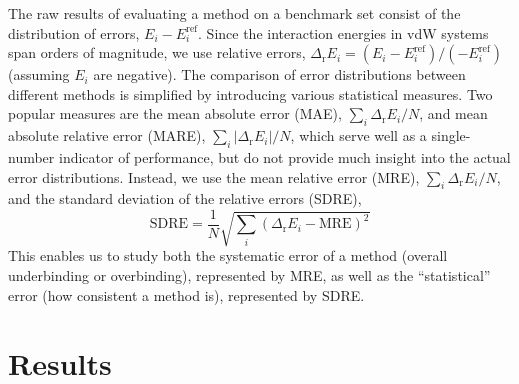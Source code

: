The raw results of evaluating a method on a benchmark set consist of the distribution of errors, $E_i-E_i^\text{ref}$.
Since the interaction energies in vdW systems span orders of magnitude, we use relative errors, $\Delta_\mathrm rE_i=(E_i-E_i^\text{ref})/(-E_i^\text{ref})$ (assuming $E_i$ are negative).
The comparison of error distributions between different methods is simplified by introducing various statistical measures.
Two popular measures are the mean absolute error (MAE), $\sum_i\Delta_\mathrm rE_i/N$, and mean absolute relative error (MARE), $\sum_i\lvert\Delta_\mathrm rE_i\rvert/N$, which serve well as a single-number indicator of performance, but do not provide much insight into the actual error distributions.
Instead, we use the mean relative error (MRE), $\sum_i\Delta_\mathrm rE_i/N$, and the standard deviation of the relative errors (SDRE),
\[ \text{SDRE}=\frac1N\sqrt{\sum_i(\Delta_\mathrm rE_i-\text{MRE})^2} \]
This enables us to study both the systematic error of a method (overall underbinding or overbinding), represented by MRE, as well as the ``statistical'' error (how consistent a method is), represented by SDRE\@.

\section{Results}

